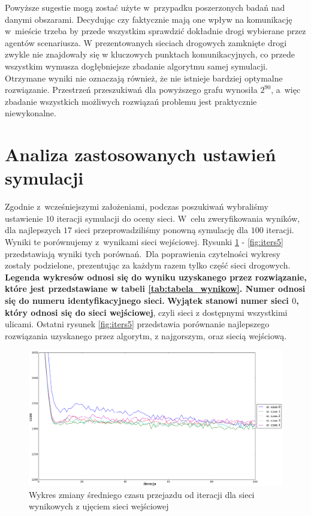 \documentclass[twoside,12pt]{report}
\begin{document}
Powyższe sugestie mogą zostać użyte w~przypadku poszerzonych badań nad danymi obszarami. Decydując czy faktycznie mają one wpływ na komunikację w~mieście trzeba by przede wszystkim sprawdzić dokładnie drogi wybierane przez agentów scenariusza. W prezentowanych sieciach drogowych zamknięte drogi zwykle nie znajdowały się w kluczowych punktach komunikacyjnych, co przede wszystkim wymusza dogłębniejsze zbadanie algorytmu samej symulacji. Otrzymane wyniki nie oznaczają również, że nie istnieje bardziej optymalne rozwiązanie. Przestrzeń przeszukiwań dla powyższego grafu wynosiła $2^{90}$, a~więc zbadanie wszystkich możliwych rozwiązań problemu jest praktycznie niewykonalne.

\section{Analiza zastosowanych ustawień symulacji}

Zgodnie z~wcześniejszymi założeniami, podczas poszukiwań wybraliśmy ustawienie $10$ iteracji symulacji do oceny sieci. W~celu zweryfikowania wyników, dla najlepszych $17$ sieci przeprowadziliśmy ponowną symulację dla $100$ iteracji. Wyniki te porównujemy z~wynikami sieci wejściowej. Rysunki \ref{fig:iters1} - \ref{fig:iters5} przedstawiają wyniki tych porównań.~Dla poprawienia czytelności wykresy zostały podzielone, prezentując za każdym razem tylko część sieci drogowych. \textbf{Legenda wykresów odnosi się do wyniku uzyskanego przez rozwiązanie, które jest przedstawiane w tabeli \ref{tab:tabela_wynikow}. Numer odnosi się do numeru identyfikacyjnego sieci.} \textbf{Wyjątek stanowi numer sieci $0$, który odnosi się do sieci wejściowej}, czyli sieci z dostępnymi wszystkimi ulicami. Ostatni rysunek \ref{fig:iters5} przedstawia porównanie najlepszego rozwiązania uzyskanego przez algorytm, z najgorszym, oraz siecią wejściową.

\begin{figure}[htbp]
\centering
\includegraphics[width=1\textwidth]{img/iters/iters1}
\caption{Wykres zmiany średniego czasu przejazdu od iteracji dla sieci wynikowych z ujęciem sieci wejściowej}
\label{fig:iters1}
\end{figure}
\end{document}
